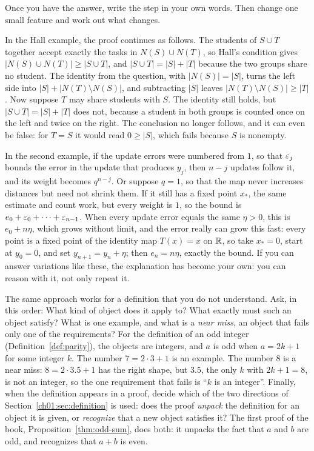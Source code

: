 Once you have the answer, write the step in your own words. Then change one small feature and work out what changes.

In the Hall example, the proof continues as follows. The students of $S\cup T$ together accept exactly the tasks in $N(S)\cup N(T)$, so Hall's condition gives $|N(S)\cup N(T)|\ge|S\cup T|$, and $|S\cup T|=|S|+|T|$ because the two groups share no student. The identity from the question, with $|N(S)|=|S|$, turns the left side into $|S|+|N(T)\setminus N(S)|$, and subtracting $|S|$ leaves $|N(T)\setminus N(S)|\ge|T|$. Now suppose $T$ may share students with $S$. The identity still holds, but $|S\cup T|=|S|+|T|$ does not, because a student in both groups is counted once on the left and twice on the right. The conclusion no longer follows, and it can even be false: for $T=S$ it would read $0\ge|S|$, which fails because $S$ is nonempty.

In the second example, if the update errors were numbered from $1$, so that $\varepsilon_j$ bounds the error in the update that produces $y_j$, then $n-j$ updates follow it, and its weight becomes $q^{n-j}$. Or suppose $q=1$, so that the map never increases distances but need not shrink them. If it still has a fixed point $x_*$, the same estimate and count work, but every weight is $1$, so the bound is $e_0+\varepsilon_0+\cdots+\varepsilon_{n-1}$. When every update error equals the same $\eta>0$, this is $e_0+n\eta$, which grows without limit, and the error really can grow this fast: every point is a fixed point of the identity map $T(x)=x$ on $\mathbb R$, so take $x_*=0$, start at $y_0=0$, and set $y_{n+1}=y_n+\eta$; then $e_n=n\eta$, exactly the bound. If you can answer variations like these, the explanation has become your own: you can reason with it, not only repeat it.

The same approach works for a definition that you do not understand. Ask, in this order: What kind of object does it apply to? What exactly must such an object satisfy? What is one example, and what is a \emph{near miss}, an object that fails only one of the requirements? For the definition of an odd integer (Definition~\ref{def:parity}), the objects are integers, and $a$ is odd when $a=2k+1$ for some integer $k$. The number $7=2\cdot3+1$ is an example. The number $8$ is a near miss: $8=2\cdot3.5+1$ has the right shape, but $3.5$, the only $k$ with $2k+1=8$, is not an integer, so the one requirement that fails is ``$k$ is an integer''. Finally, when the definition appears in a proof, decide which of the two directions of Section~\ref{ch01:sec:definition} is used: does the proof \emph{unpack} the definition for an object it is given, or \emph{recognize} that a new object satisfies it? The first proof of the book, Proposition~\ref{thm:odd-sum}, does both: it unpacks the fact that $a$ and $b$ are odd, and recognizes that $a+b$ is even.
